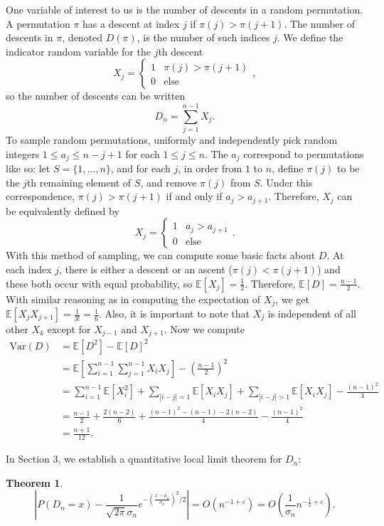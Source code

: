 \documentclass[12pt]{article} %
\newcommand{\f}[2]{\frac{#1}{#2}}
\newcommand{\p}[1]{\left(#1\right)}
\newcommand{\s}[1]{\left[#1\right]}
\newcommand{\abs}[1]{\left\lvert#1\right\rvert}
\newcommand{\Var}{\mathrm{Var}}
\newcommand{\E}{\mathbb{E}}
\newcommand{\eps}{\varepsilon}
\newtheorem{thm}{Theorem}[section]
\theoremstyle{definition}
\theoremstyle{definition}
\begin{document}
One variable of interest to us is the number of descents in a random permutation. A permutation $\pi$ has a descent at index $j$ if $\pi(j) > \pi(j+1)$. The number of descents in $\pi$, denoted $D(\pi)$, is the number of such indices $j$. We define the indicator random variable for the $j$th descent
\[ X_j = \begin{cases} 1 & \pi(j) > \pi(j+1) \\ 0 & \text{else} \end{cases}, \]
so the number of descents can be written
\[ D_n = \sum_{j=1}^{n-1} X_j. \]
To sample random permutations, uniformly and independently pick random integers $1 \leq a_j \leq n - j + 1$ for each $1 \leq j \leq n$. The $a_j$ correspond to permutations like so: let $S = \{1, \ldots, n\}$, and for each $j$, in order from $1$ to $n$, define $\pi(j)$ to be the $j$th remaining element of $S$, and remove $\pi(j)$ from $S$. Under this correspondence, $\pi(j) > \pi(j+1)$ if and only if $a_j > a_{j+1}$. Therefore, $X_j$ can be equivalently defined by
\[ X_j = \begin{cases} 1 & a_j > a_{j+1} \\ 0 & \text{else} \end{cases}. \]
	With this method of sampling, we can compute some basic facts about $D$. At each index $j$, there is either a descent or an ascent ($\pi(j) < \pi(j+1)$) and these both occur with equal probability, so $\E[X_j] = \f{1}{2}$. Therefore, $\E[D] = \f{n-1}{2}$. With similar reasoning as in computing the expectation of $X_j$, we get $\E[X_j X_{j+1}] = \f{1}{3!} = \f{1}{6}$. Also, it is important to note that $X_j$ is independent of all other $X_k$ except for $X_{j-1}$ and $X_{j+1}$. Now we compute
\begin{align*}
	\Var(D)
	&= \E[D^2] - \E[D]^2 \\
	&= \E\s{\sum_{i=1}^{n-1} \sum_{j=1}^{n-1} X_i X_j} - \p{\f{n-1}{2}}^2 \\
	&= \sum_{i=1}^{n-1} \E[X_i^2] + \sum_{\abs{i-j} = 1} \E[X_i X_j] + \sum_{\abs{i-j} > 1} \E[X_i X_j] - \f{(n-1)^2}{4} \\
	&= \f{n-1}{2} + \f{2(n-2)}{6} + \f{(n-1)^2 - (n-1) - 2(n-2)}{4} - \f{(n-1)^2}{4} \\
	&= \f{n+1}{12}.
\end{align*}

In Section 3, we establish a quantitative local limit theorem for $D_n$:
\begin{thm}
\label{thm:llt-dn}
\[ \abs{P\p{D_n = x} - \f{1}{\sqrt{2\pi}\sigma_n} e^{-\p{\f{x - \mu_n}{\sigma_n}}^2/2}} = O\p{n^{-1 + \eps}} = O\p{\f{1}{\sigma_n}n^{-\f{1}{2}+\eps}}. \]
\end{thm}
\end{document}
